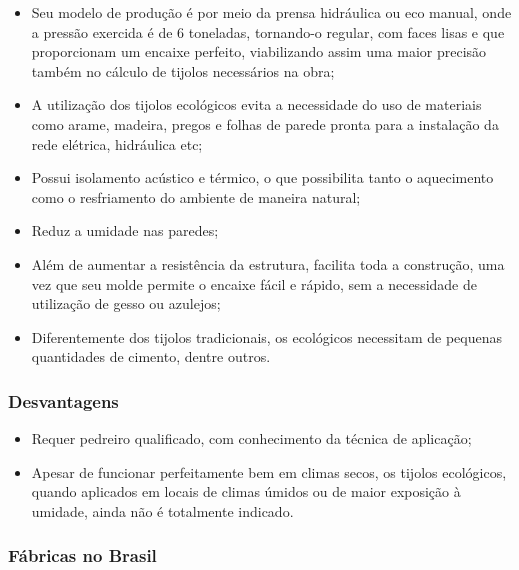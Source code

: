 	\begin{itemize}
		\item Seu modelo de produção é por meio da prensa hidráulica ou eco manual, onde a pressão exercida é de 6 toneladas, tornando-o regular, com faces lisas e que proporcionam um encaixe perfeito, viabilizando assim uma maior precisão também no cálculo de tijolos necessários na obra;

		\item A utilização dos tijolos ecológicos evita a necessidade do uso de materiais como arame, madeira, pregos e folhas de parede pronta para a instalação da rede elétrica, hidráulica etc;

		\item Possui isolamento acústico e térmico, o que possibilita tanto o aquecimento como o resfriamento do ambiente de maneira natural;

		\item Reduz a umidade nas paredes;

		\item Além de aumentar a resistência da estrutura, facilita toda a construção, uma vez que seu molde permite o encaixe fácil e rápido, sem a necessidade de utilização de gesso ou azulejos;

		\item Diferentemente dos tijolos tradicionais, os ecológicos necessitam de pequenas quantidades de cimento, dentre outros.

	\end{itemize}

\subsubsection*{\textbf{Desvantagens}}

	\begin{itemize}

		\item Requer pedreiro qualificado, com conhecimento da técnica de aplicação;

		\item Apesar de funcionar perfeitamente bem em climas secos, os tijolos ecológicos, quando aplicados em locais de climas úmidos ou de maior exposição à umidade, ainda não é totalmente indicado.

	\end{itemize}

\subsubsection*{\textbf{Fábricas no Brasil}}

